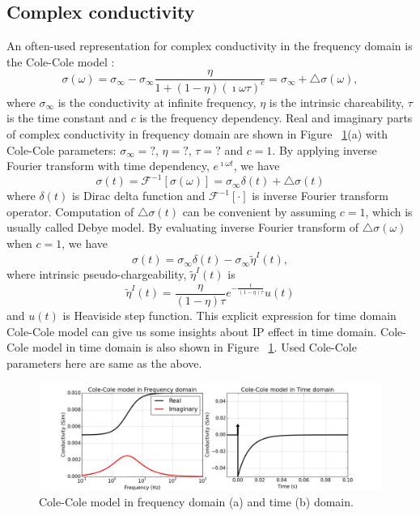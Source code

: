 \documentclass[a4paper, 11pt]{article}
\newcommand{\siginf}{\sigma_\infty}
\newcommand{\peta}{\tilde{\eta}}
\begin{document}
\subsection{Complex conductivity}
An often-used representation for complex conductivity in the frequency domain is the Cole-Cole model \cite{COLE}:
\begin{equation}
  \sigma(\omega) = \sigma_{\infty} - \sigma_{\infty}\frac{\eta}{1+(1-\eta)(\imath\omega\tau)^c} = \sigma_{\infty} + \triangle\sigma(\omega),
  \label{eq: sigma_freq}
\end{equation}
where $\sigma_{\infty}$ is the conductivity at infinite frequency, $\eta$ is the intrinsic chareability, $\tau$ is the time constant and $c$ is the frequency dependency. Real and imaginary parts of complex conductivity in frequency domain are shown in Figure ~\ref{Fig:FDandTDCole}(a) with Cole-Cole parameters: $\siginf = ?$, $\eta = ?$, $\tau = ?$ and $c=1$. By applying inverse Fourier transform with time dependency, $e^{\imath\omega t}$, we have
\begin{equation}
  \sigma(t) = \mathscr{F}^{-1}[\sigma(\omega)] = \sigma_{\infty}\delta(t) + \triangle\sigma(t)
  \label{eq: sigma_time}
\end{equation}
where $\delta(t)$ is Dirac delta function and $\mathscr{F}^{-1}[\cdot]$ is inverse Fourier transform operator. Computation of $\triangle\sigma(t)$ can be convenient by assuming $c=1$, which is usually called Debye model. By evaluating inverse Fourier transform of $\triangle\sigma(\omega)$ when $c=1$, we have
\begin{equation}
  \sigma(t) = \sigma_{\infty}\delta(t) - \siginf\peta^{I}(t),
  \label{eq: sigma_time_c1}
\end{equation}
where intrinsic pseudo-chargeability, $\peta^{I}(t)$ is
\begin{equation}
    \peta^{I}(t) = \frac{\eta}{(1-\eta)\tau}e^{-\frac{t}{(1-\eta)\tau}}u(t)
    \label{eq: intrinsic_peta}
\end{equation}
and $u(t)$ is Heaviside step function. This explicit expression for time domain Cole-Cole model can give us some insights about IP effect in time domain. Cole-Cole model in time domain is also shown in Figure ~\ref{Fig:FDandTDCole}. Used Cole-Cole parameters here are same as the above.

\begin{figure}[htb]
  \centering
  \includegraphics[width=1.0\textwidth]{figures/FDandTDCole.png}
  \caption{Cole-Cole model in frequency domain (a) and time (b) domain. }
  \label{Fig:FDandTDCole}
\end{figure}
\clearpage
\end{document}
